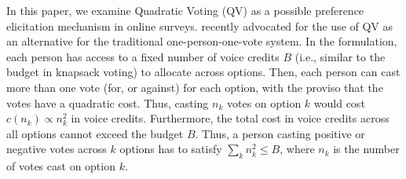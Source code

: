 


In this paper, we examine Quadratic Voting (QV) as a possible preference elicitation mechanism in online surveys. \textcite{posner2018radical} recently advocated for the use of QV as an alternative for the traditional one-person-one-vote system. In the \textcite{posner2018radical} formulation, each person has access to a fixed number of voice credits $B$ (i.e., similar to the budget in knapsack voting) to allocate across options. Then, each person can cast more than one vote (for, or against) for each option, with the proviso that the votes have a quadratic cost. Thus, casting $n_k$ votes on option $k$ would cost $c(n_k) \propto n_k^2$ in voice credits. Furthermore, the total cost in voice credits across all options cannot exceed the budget $B$. Thus, a person casting positive or negative votes across $k$ options has to satisfy $\sum_k n_k^2 \leqslant B$, where $n_k$ is the number of votes cast on option $k$. 


